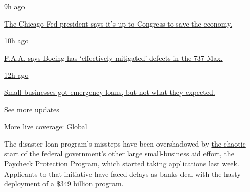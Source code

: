 \href{https://www.nytimes.com/live/2020/08/03/business/stock-market-today-coronavirus?action=click\&pgtype=Article\&state=default\&region=MAIN_CONTENT_1\&context=storylines_live_updates\#the-chicago-fed-president-says-its-up-to-congress-to-save-the-economy}{9h
ago}

\href{https://www.nytimes.com/live/2020/08/03/business/stock-market-today-coronavirus?action=click\&pgtype=Article\&state=default\&region=MAIN_CONTENT_1\&context=storylines_live_updates\#the-chicago-fed-president-says-its-up-to-congress-to-save-the-economy}{The
Chicago Fed president says it's up to Congress to save the economy.}

\href{https://www.nytimes.com/live/2020/08/03/business/stock-market-today-coronavirus?action=click\&pgtype=Article\&state=default\&region=MAIN_CONTENT_1\&context=storylines_live_updates\#faa-says-boeing-has-effectively-mitigated-defects-in-the-737-max}{10h
ago}

\href{https://www.nytimes.com/live/2020/08/03/business/stock-market-today-coronavirus?action=click\&pgtype=Article\&state=default\&region=MAIN_CONTENT_1\&context=storylines_live_updates\#faa-says-boeing-has-effectively-mitigated-defects-in-the-737-max}{F.A.A.
says Boeing has `effectively mitigated' defects in the 737 Max.}

\href{https://www.nytimes.com/live/2020/08/03/business/stock-market-today-coronavirus?action=click\&pgtype=Article\&state=default\&region=MAIN_CONTENT_1\&context=storylines_live_updates\#small-businesses-got-emergency-loans-but-not-what-they-expected}{12h
ago}

\href{https://www.nytimes.com/live/2020/08/03/business/stock-market-today-coronavirus?action=click\&pgtype=Article\&state=default\&region=MAIN_CONTENT_1\&context=storylines_live_updates\#small-businesses-got-emergency-loans-but-not-what-they-expected}{Small
businesses got emergency loans, but not what they expected.}

\href{https://www.nytimes.com/live/2020/08/03/business/stock-market-today-coronavirus?action=click\&pgtype=Article\&state=default\&region=MAIN_CONTENT_1\&context=storylines_live_updates}{See
more updates}

More live coverage:
\href{https://www.nytimes.com/2020/08/03/world/coronavirus-covid-19.html?action=click\&pgtype=Article\&state=default\&region=MAIN_CONTENT_1\&context=storylines_live_updates}{Global}

The disaster loan program's missteps have been overshadowed by
\href{https://www.nytimes.com/2020/04/07/business/coronavirus-ppp-small-business-aid.html}{the
chaotic start} of the federal government's other large small-business
aid effort, the Paycheck Protection Program, which started taking
applications last week. Applicants to that initiative have faced delays
as banks deal with the hasty deployment of a \$349 billion program.


